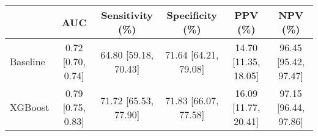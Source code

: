 \begin{tabular}{l|ccccc}
\toprule
 & AUC & Sensitivity (\%) & Specificity (\%) & PPV (\%) & NPV (\%) \\
\midrule
Baseline &  0.72 [0.70, 0.74] &  64.80 [59.18, 70.43] &  71.64 [64.21, 79.08] &  14.70 [11.35, 18.05] &  96.45 [95.42, 97.47] \\
XGBoost &  0.79 [0.75, 0.83] &  71.72 [65.53, 77.90] &  71.83 [66.07, 77.58] &  16.09 [11.77, 20.41] &  97.15 [96.44, 97.86] \\
\bottomrule
\end{tabular}

